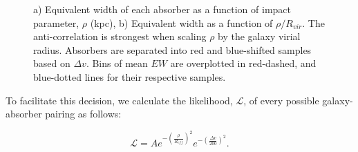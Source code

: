 \documentclass[iop]{emulateapj-rtx4}
\begin{document}
\begin{figure}[t]
\centering
{}
\caption{\small{a) Equivalent width of each absorber as a function of impact parameter, $\rho$ (kpc), b) Equivalent width as a function of $\rho/R_{vir}$. The anti-correlation is strongest when scaling $\rho$ by the galaxy virial radius. Absorbers are separated into red and blue-shifted samples based on $\Delta v$. Bins of mean $EW$ are overplotted in red-dashed, and blue-dotted lines for their respective samples.}}
\vspace{5pt}
\end{figure}


To facilitate this decision, we calculate the likelihood, $\mathcal{L}$, of every possible galaxy-absorber pairing as follows:

\begin{equation}
	\mathcal{L} = A e^{-(\frac{\rho}{R_{eff}})^2} e^{-(\frac{\Delta v}{200})^2}.
\end{equation}
\end{document}
